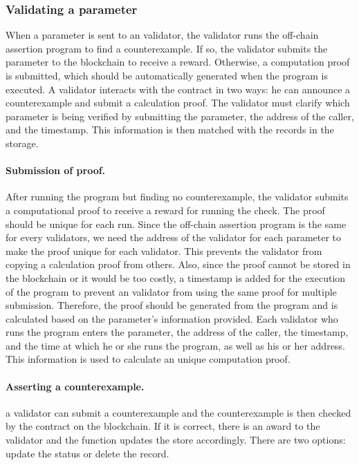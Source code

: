 \documentclass[runningheads]{llncs}
\begin{document}
\subsubsection{Validating a parameter}
When a parameter is sent to an validator, the validator runs the off-chain assertion program to find a counterexample. If so, the validator submits the parameter to the blockchain to receive a reward. Otherwise, a computation proof is submitted, which should be automatically generated when the program is executed. A validator interacts with the contract in two ways: he can announce a counterexample and submit a calculation proof. The validator must clarify which parameter is being verified by submitting the parameter, the address of the caller, and the timestamp. This information is then matched with the records in the storage.

\paragraph{Submission of proof.} After running the program but finding no counterexample, the validator submits a computational proof to receive a reward for running the check. The proof should be unique for each run. Since the off-chain assertion program is the same for every validators, we need the address of the validator for each parameter to make the proof unique for each validator. This prevents the validator from copying a calculation proof from others. Also, since the proof cannot be stored in the blockchain or it would be too costly, a timestamp is added for the execution of the program to prevent an validator from using the same proof for multiple submission. Therefore, the proof should be generated from the program and is calculated based on the parameter's information provided. Each validator who runs the program enters the parameter, the address of the caller, the timestamp, and the time at which he or she runs the program, as well as his or her address. This information is used to calculate an unique computation proof.
\paragraph{Asserting a counterexample.} a validator can submit a counterexample and the counterexample is then checked by the contract on the blockchain. If it is correct, there is an award to the validator and the function updates the store accordingly. There are two options: update the status or delete the record. 
 
\end{document}
